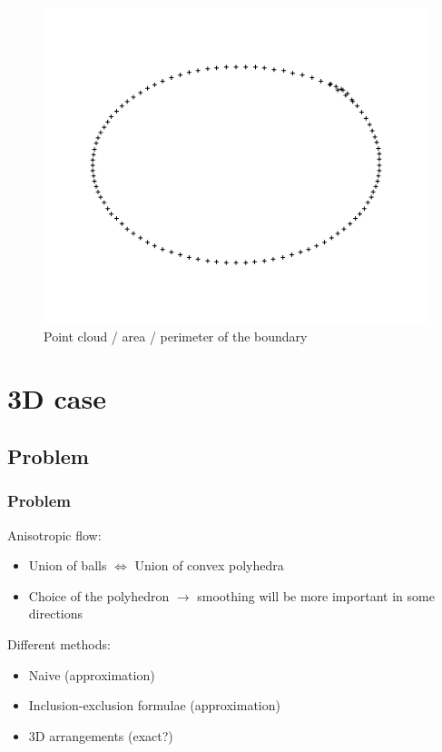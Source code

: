 \documentclass{beamer}
\begin{document}
\begin{frame}
\begin{figure}
        \includegraphics[scale=0.2]{img/ellipse-outliers-perimeter}
        \caption*{Point cloud / area / perimeter of the boundary}
    \end{figure}
\end{frame}

\section{3D case}

\subsection{Problem}
\begin{frame}
    \frametitle{Problem}

    Anisotropic flow:
    \begin{itemize}
        \item Union of balls $ \iff $ Union of convex polyhedra
        \item Choice of the polyhedron $ \to $ smoothing will be more important
            in some directions
    \end{itemize}

    Different methods:
    \begin{itemize}
        \item Naive (approximation)
        \item Inclusion-exclusion formulae (approximation)
        \item 3D arrangements (exact?)
    \end{itemize}
\end{frame}
\end{document}

